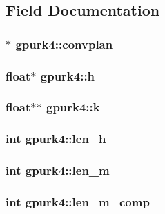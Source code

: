 \subsection{Field Documentation}
\hypertarget{structgpurk4_a171baa3e8a5ae41da07eb35d6ec6cdac}{
\subsubsection[{convplan}]{$\ast$ {\bf gpurk4::convplan}}}
\label{structgpurk4_a171baa3e8a5ae41da07eb35d6ec6cdac}
\hypertarget{structgpurk4_a6571949e590edcfe1cb57c1763f83951}{
\subsubsection[{h}]{\setlength{\rightskip}{0pt plus 5cm}float$\ast$ {\bf gpurk4::h}}}
\label{structgpurk4_a6571949e590edcfe1cb57c1763f83951}
\hypertarget{structgpurk4_a6248cd4b046b035ae9fcf1d73897305d}{
\subsubsection[{k}]{\setlength{\rightskip}{0pt plus 5cm}float$\ast$$\ast$ {\bf gpurk4::k}}}
\label{structgpurk4_a6248cd4b046b035ae9fcf1d73897305d}
\hypertarget{structgpurk4_a6a6691c189cb222b395f063cafa2eb42}{
\subsubsection[{len\_\-h}]{\setlength{\rightskip}{0pt plus 5cm}int {\bf gpurk4::len\_\-h}}}
\label{structgpurk4_a6a6691c189cb222b395f063cafa2eb42}
\hypertarget{structgpurk4_a372a61c48e790fae18e9dd454e6dbe49}{
\subsubsection[{len\_\-m}]{\setlength{\rightskip}{0pt plus 5cm}int {\bf gpurk4::len\_\-m}}}
\label{structgpurk4_a372a61c48e790fae18e9dd454e6dbe49}
\hypertarget{structgpurk4_a24de106fa1f3355179e63f1930fef06b}{
\subsubsection[{len\_\-m\_\-comp}]{\setlength{\rightskip}{0pt plus 5cm}int {\bf gpurk4::len\_\-m\_\-comp}}}
